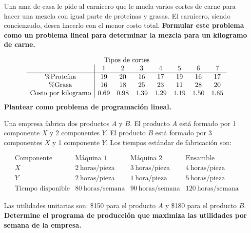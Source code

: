 \begin{Ejer} Una ama de casa le pide al carnicero que le muela varios cortes de carne para hacer una mezcla con igual parte de prote\'inas y grasas. El carnicero, siendo concienzudo, desea hacerlo con el menor costo total. \textbf{Formular este problema como un problema lineal para determinar la mezcla para un kilogramo de carne.}

\[
\begin{array}{c|ccccccc}
\multicolumn{8}{c}{\text{Tipos de cortes}} \\
 & 1 & 2 & 3 & 4 & 5 & 6 & 7 \\
\hline
\% \text{Prote\'ina} & 19 & 20 & 16 & 17 & 19 & 16 & 17 \\
\% \text{Grasa} & 16 & 18 & 25 & 23 & 11 & 28 & 20 \\
\text{Costo por kilogramo} & 0.69 & 0.98 & 1.39 & 1.29 & 1.19 & 1.50 & 1.65
\end{array}
\]
\textbf{Plantear como problema de programaci\'on lineal.}
\end{Ejer}

\begin{Ejer}
Una empresa fabrica dos productos $A$ y $B$. El producto $A$ est\'a formado por 1 componente $X$ y 2 componentes $Y$. El producto $B$ est\'a formado por 3 componentes $X$ y 1 componente $Y$. Los tiempos est\'andar de fabricaci\'on son:

\[
\begin{array}{l|ccc}
\text{Componente} & \text{M\'aquina 1} & \text{M\'aquina 2} & \text{Ensamble} \\
\hline
X & 2\ \text{horas/pieza} & 3\ \text{horas/pieza} & 4\ \text{horas/pieza} \\
Y & 2\ \text{horas/pieza} & 1\ \text{hora/pieza} & 5\ \text{horas/pieza} \\
\hline
\text{Tiempo disponible} & 80\ \text{horas/semana} & 90\ \text{horas/semana} & 120\ \text{horas/semana}
\end{array}
\]

Las utilidades unitarias son: \$150 para el producto $A$ y \$180 para el producto $B$. \textbf{Determine el programa de producci\'on que maximiza las utilidades por semana de la empresa.}
\end{Ejer}


